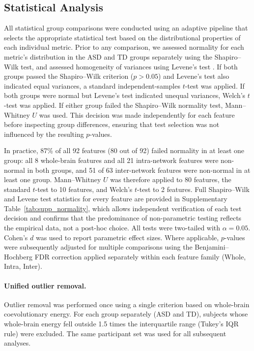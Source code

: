 \documentclass[10pt,letterpaper]{article}
\begin{document}
\subsection*{Statistical Analysis}
All statistical group comparisons were conducted using an adaptive pipeline that selects the
appropriate statistical test based on the distributional properties of each individual metric.
Prior to any comparison, we assessed normality for each metric's distribution in the ASD and TD
groups separately using the Shapiro--Wilk test, and assessed homogeneity of variances using
Levene's test \cite{levene1960}. If both groups passed the Shapiro--Wilk criterion ($p > 0.05$)
and Levene's test also indicated equal variances, a standard independent-samples $t$-test was
applied. If both groups were normal but Levene's test indicated unequal variances, Welch's $t$-test
was applied. If either group failed the Shapiro--Wilk normality test, Mann--Whitney $U$ was used.
This decision was made independently for each feature before inspecting group differences, ensuring
that test selection was not influenced by the resulting $p$-values.

In practice, 87\% of all 92 features (80 out of 92) failed normality in at least one group: all 8
whole-brain features and all 21 intra-network features were non-normal in both groups, and 51 of
63 inter-network features were non-normal in at least one group. Mann--Whitney $U$ was therefore
applied to 80 features, the standard $t$-test to 10 features, and Welch's $t$-test to 2 features.
Full Shapiro--Wilk and Levene test statistics for every feature are provided in Supplementary
Table~\ref{tab:supp_normality}, which allows independent verification of each test decision and
confirms that the predominance of non-parametric testing reflects the empirical data, not a
post-hoc choice. All tests were two-tailed with $\alpha = 0.05$. Cohen's $d$ was used to report
parametric effect sizes. Where applicable, $p$-values were subsequently adjusted for multiple
comparisons using the Benjamini--Hochberg FDR correction applied separately within each feature
family (Whole, Intra, Inter).

\paragraph*{Unified outlier removal.}
Outlier removal was performed once using a single criterion based on whole-brain coevolutionary
energy. For each group separately (ASD and TD), subjects whose whole-brain energy fell outside
1.5 times the interquartile range (Tukey's IQR rule) were excluded. The same participant set was
used for all subsequent analyses.
\end{document}
